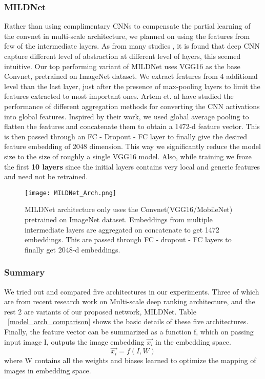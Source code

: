 \documentclass[10pt,twocolumn,letterpaper]{article}
\begin{document}
\subsubsection{MILDNet}
Rather than using complimentary CNNs to compensate the partial learning of the convnet in multi-scale architecture, we planned on using the features from few of the intermediate layers. As from many studies \cite{c6}, it is found that deep CNN capture different level of abstraction at different level of layers, this seemed intuitive. Our top performing variant of MILDNet uses VGG16 as the base Convnet, pretrained on ImageNet dataset. We extract features from 4 additional level than the last layer, just after the presence of max-pooling layers to limit the features extracted to most important ones. Artem et. al \cite{c10} have studied the performance of different aggregation methods for converting the CNN activations into global features. Inspired by their work, we used global average pooling to flatten the features and concatenate them to obtain a 1472-d feature vector. This is then passed through an FC - Dropout - FC layer to finally give the desired feature embedding of 2048 dimension. This way we significantly reduce the model size to the size of roughly a single VGG16 model. Also, while training we froze the first \textbf{10 layers} since the initial layers contains very local and generic features and need not be retrained.
\begin{figure}[hbt!]
\centering
\texttt{[image: MILDNet\_Arch.png]}
\caption{MILDNet architecture only uses the Convnet(VGG16/MobileNet) pretrained on ImageNet dataset. Embeddings from multiple intermediate layers are aggregated on concatenate to get 1472 embeddings. This are passed through FC - dropout - FC layers to finally get 2048-d embeddings.}
\label{fig:MILDNet_arch}
\end{figure}

\subsubsection{Summary}
We tried out and compared five architectures in our experiments. Three of which are from recent research work on Multi-scale deep ranking architecture, and the rest 2 are variants of our proposed network, MILDNet. Table ~\ref{model_arch_comparison} shows the basic details of these five architectures. 
Finally, the feature vector can be summarized as a function f, which on passing input image I, outputs the image embedding $\Vec{x_i}$ in the embedding space.
\begin{equation}
\Vec{x_i} = f(I,W)
\end{equation}
where W contains all the weights and biases learned to optimize the mapping of images in embedding space.
\end{document}
